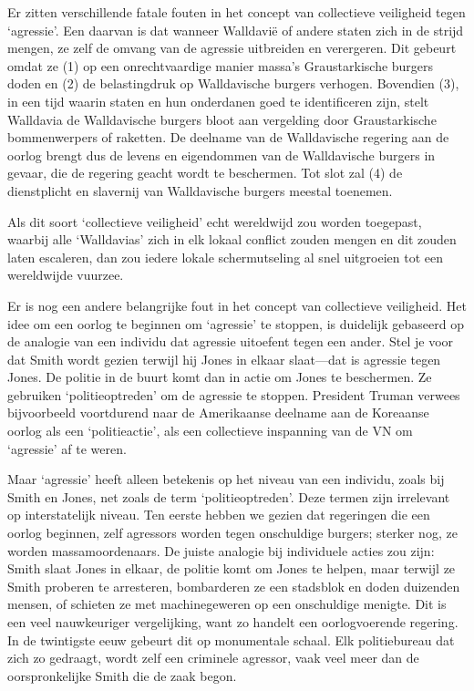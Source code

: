\documentclass[
  a5paper,
  smalldemyvopaper,10pt,twoside,onecolumn,openright,extrafontsizes,hidelinks]{memoir}
\begin{document}
Er zitten verschillende fatale fouten in het concept van collectieve
veiligheid tegen `agressie'. Een daarvan is dat wanneer Walldavië of
andere staten zich in de strijd mengen, ze zelf de omvang van de
agressie uitbreiden en verergeren. Dit gebeurt omdat ze (1) op een
onrechtvaardige manier massa's Graustarkische burgers doden en (2) de
belastingdruk op Walldavische burgers verhogen. Bovendien (3), in een
tijd waarin staten en hun onderdanen goed te identificeren zijn, stelt
Walldavia de Walldavische burgers bloot aan vergelding door
Graustarkische bommenwerpers of raketten. De deelname van de
Walldavische regering aan de oorlog brengt dus de levens en eigendommen
van de Walldavische burgers in gevaar, die de regering geacht wordt te
beschermen. Tot slot zal (4) de dienstplicht en slavernij van
Walldavische burgers meestal toenemen.

Als dit soort `collectieve veiligheid' echt wereldwijd zou worden
toegepast, waarbij alle `Walldavias' zich in elk lokaal conflict zouden
mengen en dit zouden laten escaleren, dan zou iedere lokale
schermutseling al snel uitgroeien tot een wereldwijde vuurzee.

Er is nog een andere belangrijke fout in het concept van collectieve
veiligheid. Het idee om een oorlog te beginnen om `agressie' te stoppen,
is duidelijk gebaseerd op de analogie van een individu dat agressie
uitoefent tegen een ander. Stel je voor dat Smith wordt gezien terwijl
hij Jones in elkaar slaat---dat is agressie tegen Jones. De politie in
de buurt komt dan in actie om Jones te beschermen. Ze gebruiken
`politieoptreden' om de agressie te stoppen. President Truman verwees
bijvoorbeeld voortdurend naar de Amerikaanse deelname aan de Koreaanse
oorlog als een `politieactie', als een collectieve inspanning van de VN
om `agressie' af te weren.

Maar `agressie' heeft alleen betekenis op het niveau van een individu,
zoals bij Smith en Jones, net zoals de term `politieoptreden'. Deze
termen zijn irrelevant op interstatelijk niveau. Ten eerste hebben we
gezien dat regeringen die een oorlog beginnen, zelf agressors worden
tegen onschuldige burgers; sterker nog, ze worden massamoordenaars. De
juiste analogie bij individuele acties zou zijn: Smith slaat Jones in
elkaar, de politie komt om Jones te helpen, maar terwijl ze Smith
proberen te arresteren, bombarderen ze een stadsblok en doden duizenden
mensen, of schieten ze met machinegeweren op een onschuldige menigte.
Dit is een veel nauwkeuriger vergelijking, want zo handelt een
oorlogvoerende regering. In de twintigste eeuw gebeurt dit op
monumentale schaal. Elk politiebureau dat zich zo gedraagt, wordt zelf
een criminele agressor, vaak veel meer dan de oorspronkelijke Smith die
de zaak begon.
\end{document}
